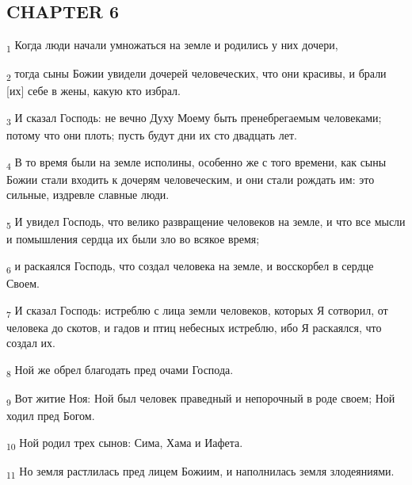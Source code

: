 \subsection{CHAPTER 6}
\begin{tcolorbox}
\textsubscript{1} Когда люди начали умножаться на земле и родились у них дочери,
\end{tcolorbox}
\begin{tcolorbox}
\textsubscript{2} тогда сыны Божии увидели дочерей человеческих, что они красивы, и брали [их] себе в жены, какую кто избрал.
\end{tcolorbox}
\begin{tcolorbox}
\textsubscript{3} И сказал Господь: не вечно Духу Моему быть пренебрегаемым человеками; потому что они плоть; пусть будут дни их сто двадцать лет.
\end{tcolorbox}
\begin{tcolorbox}
\textsubscript{4} В то время были на земле исполины, особенно же с того времени, как сыны Божии стали входить к дочерям человеческим, и они стали рождать им: это сильные, издревле славные люди.
\end{tcolorbox}
\begin{tcolorbox}
\textsubscript{5} И увидел Господь, что велико развращение человеков на земле, и что все мысли и помышления сердца их были зло во всякое время;
\end{tcolorbox}
\begin{tcolorbox}
\textsubscript{6} и раскаялся Господь, что создал человека на земле, и восскорбел в сердце Своем.
\end{tcolorbox}
\begin{tcolorbox}
\textsubscript{7} И сказал Господь: истреблю с лица земли человеков, которых Я сотворил, от человека до скотов, и гадов и птиц небесных истреблю, ибо Я раскаялся, что создал их.
\end{tcolorbox}
\begin{tcolorbox}
\textsubscript{8} Ной же обрел благодать пред очами Господа.
\end{tcolorbox}
\begin{tcolorbox}
\textsubscript{9} Вот житие Ноя: Ной был человек праведный и непорочный в роде своем; Ной ходил пред Богом.
\end{tcolorbox}
\begin{tcolorbox}
\textsubscript{10} Ной родил трех сынов: Сима, Хама и Иафета.
\end{tcolorbox}
\begin{tcolorbox}
\textsubscript{11} Но земля растлилась пред лицем Божиим, и наполнилась земля злодеяниями.
\end{tcolorbox}

